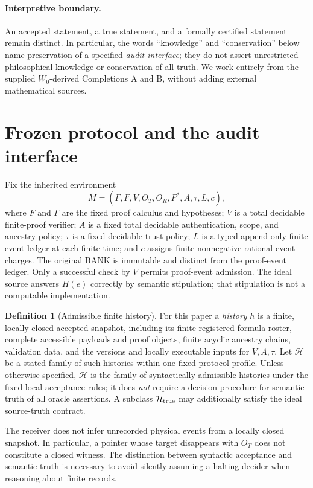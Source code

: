 \documentclass[11pt,letterpaper]{article}
\theoremstyle{definition}
\newtheorem{definition}[theorem]{Definition}
\newcommand{\Hh}{\mathcal H}
\begin{document}
\paragraph{Interpretive boundary.} An accepted statement, a true statement, and a formally certified statement remain distinct. In particular, the words ``knowledge'' and ``conservation'' below name preservation of a specified \emph{audit interface}; they do not assert unrestricted philosophical knowledge or conservation of all truth. We work entirely from the supplied $W_0$-derived Completions A and B, without adding external mathematical sources.

\section{Frozen protocol and the audit interface}
Fix the inherited environment
\[
M=(\Gamma,F,V,O_T,O_R,P^*,A,\tau,L,c),
\]
where $F$ and $\Gamma$ are the fixed proof calculus and hypotheses; $V$ is a total decidable finite-proof verifier; $A$ is a fixed total decidable authentication, scope, and ancestry policy; $\tau$ is a fixed decidable trust policy; $L$ is a typed append-only finite event ledger at each finite time; and $c$ assigns finite nonnegative rational event charges. The original BANK is immutable and distinct from the proof-event ledger. Only a successful check by $V$ permits proof-event admission. The ideal source answers $H(e)$ correctly by semantic stipulation; that stipulation is not a computable implementation.

\begin{definition}[Admissible finite history]
For this paper a \emph{history} $h$ is a finite, locally closed accepted snapshot, including its finite registered-formula roster, complete accessible payloads and proof objects, finite acyclic ancestry chains, validation data, and the versions and locally executable inputs for $V,A,\tau$. Let $\Hh$ be a stated family of such histories within one fixed protocol profile. Unless otherwise specified, $\Hh$ is the family of syntactically admissible histories under the fixed local acceptance rules; it does \emph{not} require a decision procedure for semantic truth of all oracle assertions. A subclass $\Hh_{\rm true}$ may additionally satisfy the ideal source-truth contract.
\end{definition}

The receiver does not infer unrecorded physical events from a locally closed snapshot. In particular, a pointer whose target disappears with $O_T$ does not constitute a closed witness. The distinction between syntactic acceptance and semantic truth is necessary to avoid silently assuming a halting decider when reasoning about finite records.
\end{document}
